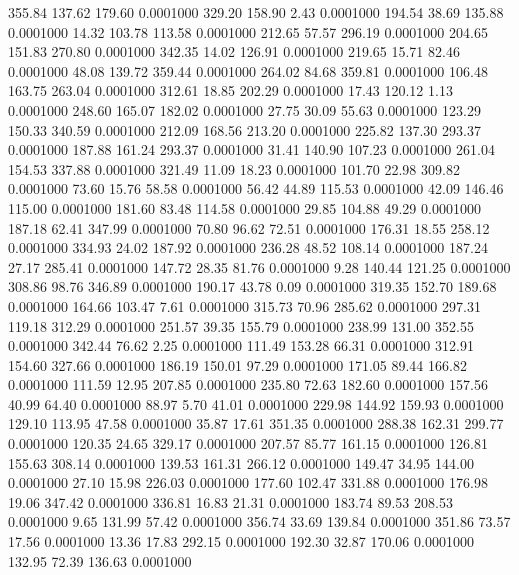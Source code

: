  355.84  137.62  179.60   0.0001000
 329.20  158.90    2.43   0.0001000
 194.54   38.69  135.88   0.0001000
  14.32  103.78  113.58   0.0001000
 212.65   57.57  296.19   0.0001000
 204.65  151.83  270.80   0.0001000
 342.35   14.02  126.91   0.0001000
 219.65   15.71   82.46   0.0001000
  48.08  139.72  359.44   0.0001000
 264.02   84.68  359.81   0.0001000
 106.48  163.75  263.04   0.0001000
 312.61   18.85  202.29   0.0001000
  17.43  120.12    1.13   0.0001000
 248.60  165.07  182.02   0.0001000
  27.75   30.09   55.63   0.0001000
 123.29  150.33  340.59   0.0001000
 212.09  168.56  213.20   0.0001000
 225.82  137.30  293.37   0.0001000
 187.88  161.24  293.37   0.0001000
  31.41  140.90  107.23   0.0001000
 261.04  154.53  337.88   0.0001000
 321.49   11.09   18.23   0.0001000
 101.70   22.98  309.82   0.0001000
  73.60   15.76   58.58   0.0001000
  56.42   44.89  115.53   0.0001000
  42.09  146.46  115.00   0.0001000
 181.60   83.48  114.58   0.0001000
  29.85  104.88   49.29   0.0001000
 187.18   62.41  347.99   0.0001000
  70.80   96.62   72.51   0.0001000
 176.31   18.55  258.12   0.0001000
 334.93   24.02  187.92   0.0001000
 236.28   48.52  108.14   0.0001000
 187.24   27.17  285.41   0.0001000
 147.72   28.35   81.76   0.0001000
   9.28  140.44  121.25   0.0001000
 308.86   98.76  346.89   0.0001000
 190.17   43.78    0.09   0.0001000
 319.35  152.70  189.68   0.0001000
 164.66  103.47    7.61   0.0001000
 315.73   70.96  285.62   0.0001000
 297.31  119.18  312.29   0.0001000
 251.57   39.35  155.79   0.0001000
 238.99  131.00  352.55   0.0001000
 342.44   76.62    2.25   0.0001000
 111.49  153.28   66.31   0.0001000
 312.91  154.60  327.66   0.0001000
 186.19  150.01   97.29   0.0001000
 171.05   89.44  166.82   0.0001000
 111.59   12.95  207.85   0.0001000
 235.80   72.63  182.60   0.0001000
 157.56   40.99   64.40   0.0001000
  88.97    5.70   41.01   0.0001000
 229.98  144.92  159.93   0.0001000
 129.10  113.95   47.58   0.0001000
  35.87   17.61  351.35   0.0001000
 288.38  162.31  299.77   0.0001000
 120.35   24.65  329.17   0.0001000
 207.57   85.77  161.15   0.0001000
 126.81  155.63  308.14   0.0001000
 139.53  161.31  266.12   0.0001000
 149.47   34.95  144.00   0.0001000
  27.10   15.98  226.03   0.0001000
 177.60  102.47  331.88   0.0001000
 176.98   19.06  347.42   0.0001000
 336.81   16.83   21.31   0.0001000
 183.74   89.53  208.53   0.0001000
   9.65  131.99   57.42   0.0001000
 356.74   33.69  139.84   0.0001000
 351.86   73.57   17.56   0.0001000
  13.36   17.83  292.15   0.0001000
 192.30   32.87  170.06   0.0001000
 132.95   72.39  136.63   0.0001000
